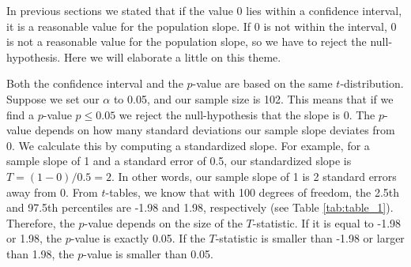 \documentclass[]{book}\usepackage[]{graphicx}\usepackage[]{color}
\begin{document}
%
%
%


In previous sections we stated that if the value 0 lies within a confidence interval, it is a reasonable value for the population slope. If 0 is not within the interval, 0 is not a reasonable value for the population slope, so we have to reject the null-hypothesis. Here we will elaborate a little on this theme.

Both the confidence interval and the $p$-value are based on the same $t$-distribution. Suppose we set our $\alpha$ to 0.05, and our sample size is 102. This means that if we find a $p$-value $p \leq 0.05$ we reject the null-hypothesis that the slope is 0. The $p$-value depends on how many standard deviations our sample slope deviates from 0. We calculate this by computing a standardized slope. For example, for a sample slope of 1 and a standard error of 0.5, our standardized slope is $T=(1-0)/0.5=2$. In other words, our sample slope of 1 is 2 standard errors away from 0. From $t$-tables, we know that with 100 degrees of freedom, the 2.5th and 97.5th percentiles are -1.98 and 1.98, respectively (see Table \ref{tab:table_1}). Therefore, the $p$-value depends on the size of the $T$-statistic. If it is equal to -1.98 or 1.98, the $p$-value is exactly 0.05. If the $T$-statistic is smaller than -1.98 or larger than 1.98, the $p$-value is smaller than 0.05.
\end{document}
